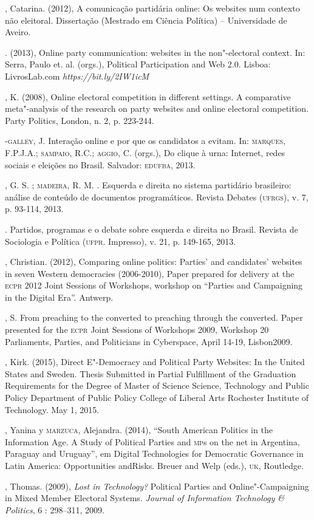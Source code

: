 \begin{bibliohedra}
, Catarina. (2012), A comunicação partidária online: Os websites
num contexto não eleitoral. Dissertação (Mestrado em Ciência Política)
-- Universidade de Aveiro.

\titidem. (2013), Online party communication: websites in the
non"-electoral context. In: Serra, Paulo et. al. (orgs.), Political
Participation and Web 2.0. Lisboa: LivrosLab.com
\emph{https://bit.ly/2IW1icM}

, K. (2008), Online electoral competition in different
settings. A comparative meta"-analysis of the research on party websites
and online electoral competition. Party Politics, London, n. 2, p.
223-244.

-\textsc{galley}, J. Interação online e por que os candidatos a evitam.
In: \textsc{marques}, F.P.J.A.; \textsc{sampaio}, R.C.; \textsc{aggio}, C. (orgs.), Do clique à
urna: Internet, redes sociais e eleições no Brasil. Salvador: \textsc{edufba},
2013.

, G. S. ; \textsc{madeira}, R. M. . Esquerda e direita no sistema
partidário brasileiro: análise de conteúdo de documentos programáticos.
Revista Debates (\textsc{ufrgs}), v. 7, p. 93-114, 2013.

\titidem. Partidos, programas e o debate sobre
esquerda e direita no Brasil. Revista de Sociologia e Política (\textsc{ufpr}.
Impresso), v. 21, p. 149-165, 2013.

, Christian. (2012), Comparing online politics: Parties' and
candidates' websites in seven Western democracies (2006-2010), Paper
prepared for delivery at the \textsc{ecpr} 2012 Joint Sessions of Workshops,
workshop on ``Parties and Campaigning in the Digital Era''. Antwerp.

, S. From preaching to the converted to preaching through the
converted. Paper presented for the \textsc{ecpr} Joint Sessions of Workshops
2009, Workshop 20 Parliaments, Parties, and Politicians in Cyberspace,
April 14-19, Lisbon2009.

, Kirk. (2015), Direct E"-Democracy and Political Party Websites:
In the United States and Sweden. Thesis Submitted in Partial Fulfillment
of the Graduation Requirements for the Degree of Master of Science
Science, Technology and Public Policy Department of Public Policy
College of Liberal Arts Rochester Institute of Technology. May 1, 2015.

, Yanina y \textsc{marzuca}, Alejandra. (2014), ``South American Politics in
the Information Age. A Study of Political Parties and \textsc{mp}s on the net in
Argentina, Paraguay and Uruguay'', em Digital Technologies for
Democratic Governance in Latin America: Opportunities andRisks. Breuer
and Welp (eds.), \textsc{uk}, Routledge.

, Thomas. (2009), \emph{Lost in Technology?} Political Parties and
Online"-Campaigning in Mixed Member Electoral Systems. \emph{Journal of
Information Technology \& Politics}, 6 : 298--311, 2009.
\end{bibliohedra}


